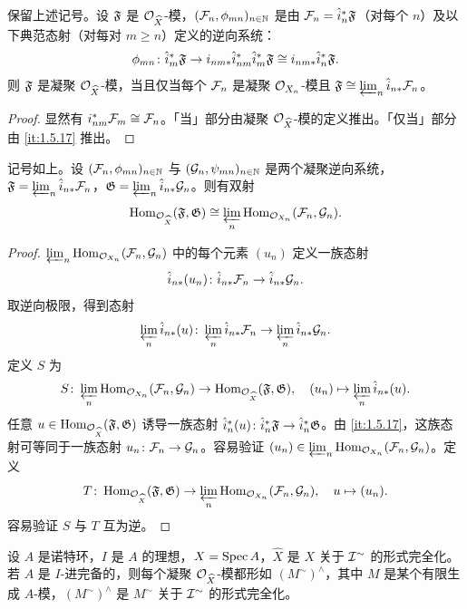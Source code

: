 \begin{proposition}\label{it:1.5.18}
保留上述记号。设 $\mathfrak{F}$ 是 $\mathcal{O}_{\widehat X}$-模，$(\mathcal{F}_n,\phi_{mn})_{n\in\mathbb{N}}$ 是由 $\mathcal{F}_n=\hat i_n^*\mathfrak{F}$（对每个 $n$）及以下典范态射（对每对 $m\ge n$）定义的逆向系统：
\[
\phi_{mn}\colon\hat i_m^*\mathfrak{F}\to i_{nm*}\hat i_{nm}^*\hat i_m^*\mathfrak{F}\cong i_{nm*}\hat i_n^*\mathfrak{F}.
\]
则 $\mathfrak{F}$ 是凝聚 $\mathcal{O}_{\widehat X}$-模，当且仅当每个 $\mathcal{F}_n$ 是凝聚 $\mathcal{O}_{X_n}$-模且 $\mathfrak{F}\cong\varprojlim_n\hat i_{n*}\mathcal{F}_n$。
\end{proposition}

\begin{proof}
显然有 $i_{nm}^*\mathcal{F}_m\cong\mathcal{F}_n$。「当」部分由凝聚 $\mathcal{O}_{\widehat X}$-模的定义推出。「仅当」部分由 \ref{it:1.5.17} 推出。
\end{proof}

\begin{corollary}\label{it:1.5.19}
记号如上。设 $(\mathcal{F}_n,\phi_{mn})_{n\in\mathbb{N}}$ 与 $(\mathcal{G}_n,\psi_{mn})_{n\in\mathbb{N}}$ 是两个凝聚逆向系统，$\mathfrak{F}=\varprojlim_n\hat i_{n*}\mathcal{F}_n$，$\mathfrak{G}=\varprojlim_n\hat i_{n*}\mathcal{G}_n$。则有双射
\[
\operatorname{Hom}_{\mathcal{O}_{\widehat X}}(\mathfrak{F},\mathfrak{G})\cong\varprojlim_n\operatorname{Hom}_{\mathcal{O}_{X_n}}(\mathcal{F}_n,\mathcal{G}_n).
\]
\end{corollary}

\begin{proof}
$\varprojlim_n\operatorname{Hom}_{\mathcal{O}_{X_n}}(\mathcal{F}_n,\mathcal{G}_n)$ 中的每个元素 $(u_n)$ 定义一族态射
\[
\hat i_{n*}(u_n)\colon\hat i_{n*}\mathcal{F}_n\to\hat i_{n*}\mathcal{G}_n.
\]
取逆向极限，得到态射
\[
\varprojlim_n\hat i_{n*}(u)\colon\varprojlim_n\hat i_{n*}\mathcal{F}_n\to\varprojlim_n\hat i_{n*}\mathcal{G}_n.
\]
定义 $S$ 为
\[
S\colon\varprojlim_n\operatorname{Hom}_{\mathcal{O}_{X_n}}(\mathcal{F}_n,\mathcal{G}_n)\to\operatorname{Hom}_{\mathcal{O}_{\widehat X}}(\mathfrak{F},\mathfrak{G}),\quad
(u_n)\mapsto\varprojlim_n\hat i_{n*}(u).
\]
任意 $u\in\operatorname{Hom}_{\mathcal{O}_{\widehat X}}(\mathfrak{F},\mathfrak{G})$ 诱导一族态射 $\hat i_n^*(u)\colon\hat i_n^*\mathfrak{F}\to\hat i_n^*\mathfrak{G}$。由 \ref{it:1.5.17}，这族态射可等同于一族态射 $u_n\colon\mathcal{F}_n\to\mathcal{G}_n$。容易验证 $(u_n)\in\varprojlim_n\operatorname{Hom}_{\mathcal{O}_{X_n}}(\mathcal{F}_n,\mathcal{G}_n)$。定义
\[
T\colon\operatorname{Hom}_{\mathcal{O}_{\widehat X}}(\mathfrak{F},\mathfrak{G})\to\varprojlim_n\operatorname{Hom}_{\mathcal{O}_{X_n}}(\mathcal{F}_n,\mathcal{G}_n),\quad u\mapsto(u_n).
\]
容易验证 $S$ 与 $T$ 互为逆。
\end{proof}

\begin{proposition}\label{it:1.5.20}
设 $A$ 是诺特环，$I$ 是 $A$ 的理想，$X=\operatorname{Spec} A$，$\widehat X$ 是 $X$ 关于 $\mathcal{I}^{\sim}$ 的形式完全化。若 $A$ 是 $I$-进完备的，则每个凝聚 $\mathcal{O}_{\widehat X}$-模都形如 $(M^{\sim})^{\wedge}$，其中 $M$ 是某个有限生成 $A$-模，$(M^{\sim})^{\wedge}$ 是 $M^{\sim}$ 关于 $\mathcal{I}^{\sim}$ 的形式完全化。
\end{proposition}


